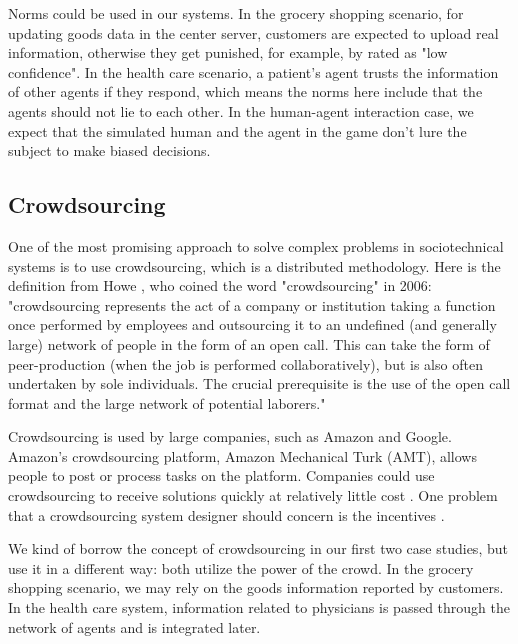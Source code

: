 Norms could be used in our systems. In the grocery shopping scenario, for updating goods data in the center server, customers are expected to upload real information, otherwise they get punished, for example, by rated as "low confidence". In the health care scenario, a patient's agent trusts the information of other agents if they respond, which means the norms here include that the agents should not lie to each other. In the human-agent interaction case, we expect that the simulated human and the agent in the game don't lure the subject to make biased decisions.    

\subsection{Crowdsourcing}
\label{ch1:crowdsourcing}

One of the most promising approach to solve complex problems in sociotechnical systems is to use crowdsourcing, which is a distributed methodology. Here is the definition from Howe \cite{crowdsourcing}, who coined the word "crowdsourcing" in 2006: "crowdsourcing represents the act of a company or institution taking a function once performed by employees and outsourcing it to an undefined (and generally large) network of people in the form of an open call. This can take the form of peer-production (when the job is performed collaboratively), but is also often undertaken by sole individuals. The crucial prerequisite is the use of the open call format and the large network of potential laborers." 

Crowdsourcing is used by large companies, such as Amazon and Google. Amazon's crowdsourcing platform, Amazon Mechanical Turk (AMT), allows people to post or process tasks on the platform. Companies could use crowdsourcing to receive solutions quickly at relatively little cost \cite{satzger2013} \cite{skopik2012}. One problem that a crowdsourcing system designer should concern is the incentives \cite{mason2009} \cite{tokarchuk2012} \cite{scekic2013}.

We kind of borrow the concept of crowdsourcing in our first two case studies, but use it in a different way: both utilize the power of the crowd. In the grocery shopping scenario, we may rely on the goods information reported by customers. In the health care system, information related to physicians is passed through the network of agents and is integrated later. 

